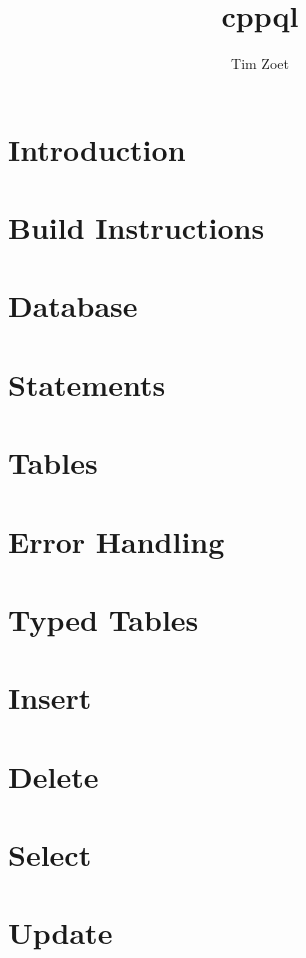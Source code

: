 \documentclass[twoside,a4paper,smallborder=true]{refart}
\title{cppql}
\author{Tim Zoet}
\date{}
\begin{document}
\maketitle

\tableofcontents
\newpage


\section{Introduction}
\label{section:introduction}

\newpage

\section{Build Instructions}
\label{section:build}

\newpage

\section{Database}
\label{section:database}

\newpage

\section{Statements}
\label{section:statements}

\newpage

\section{Tables}
\label{section:tables}

\newpage

\section{Error Handling}
\label{section:errors}

\newpage

\section{Typed Tables}
\label{section:typed_tables}

\newpage

\section{Insert}
\label{section:insert}

\newpage

\section{Delete}
\label{section:delete}

\newpage

\section{Select}
\label{section:select}

\newpage

\section{Update}
\label{section:update}

\newpage

\printglossaries
\newpage

 
 
\printindex
\end{document}
